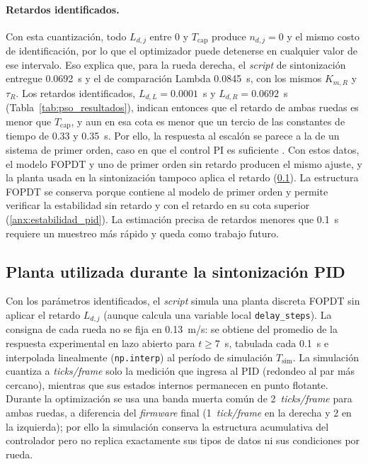 \begin{appendices}
\paragraph{Retardos identificados.} Con esta cuantización, todo $L_{d,j}$ entre
0 y $T_{\mathrm{cap}}$ produce $n_{d,j}=0$ y el mismo costo de identificación,
por lo que el optimizador puede detenerse en cualquier valor de ese intervalo.
Eso explica que, para la rueda derecha, el \textit{script} de sintonización
entregue 0.0692~s y el de comparación Lambda 0.0845~s, con los mismos
$K_{m,R}$ y $\tau_R$. Los retardos identificados, $L_{d,L}=0.0001$~s y
$L_{d,R}=0.0692$~s (Tabla~\ref{tab:pso_resultados}), indican entonces que el
retardo de ambas ruedas es menor que $T_{\mathrm{cap}}$, y aun en esa cota es
menor que un tercio de las constantes de tiempo de 0.33 y 0.35~s. Por ello, la
respuesta al escalón se parece a la de un sistema de primer orden, caso en que
el control PI es suficiente \citep[Sec.~3.6]{astrom2009controlpid}. Con estos
datos, el modelo FOPDT y uno de primer orden sin retardo producen el mismo
ajuste, y la planta usada en la sintonización tampoco aplica el retardo
(\ref{anx:planta_sintonizacion}). La estructura FOPDT se conserva porque
contiene al modelo de primer orden y permite verificar la estabilidad sin
retardo y con el retardo en su cota superior (\ref{anx:estabilidad_pid}). La
estimación precisa de retardos menores que 0.1~s requiere un muestreo más
rápido y queda como trabajo futuro.

\subsection{Planta utilizada durante la sintonización PID}
\label{anx:planta_sintonizacion}

Con los parámetros identificados, el \textit{script} simula una planta discreta FOPDT sin aplicar el retardo $L_{d,j}$ (aunque calcula una variable local \texttt{delay\_steps}). La consigna de cada rueda no se fija en 0.13~m/s: se obtiene del promedio de la respuesta experimental en lazo abierto para $t\geq7$~s, tabulada cada 0.1~s e interpolada linealmente (\texttt{np.interp}) al período de simulación $T_{\mathrm{sim}}$. La simulación cuantiza a \textit{ticks/frame} solo la medición que ingresa al PID (redondeo al par más cercano), mientras que sus estados internos permanecen en punto flotante. Durante la optimización se usa una banda muerta común de 2~\textit{ticks/frame} para ambas ruedas, a diferencia del \textit{firmware} final (1~\textit{tick/frame} en la derecha y 2 en la izquierda); por ello la simulación conserva la estructura acumulativa del controlador pero no replica exactamente sus tipos de datos ni sus condiciones por rueda.


\end{appendices}
